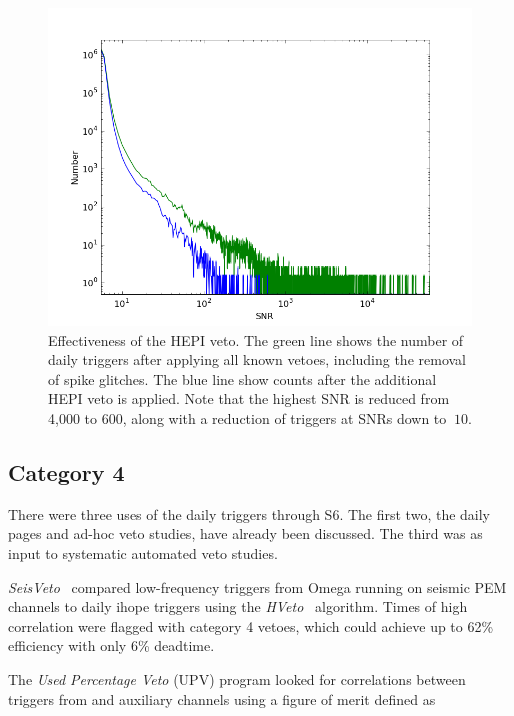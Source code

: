 \begin{figure}
  \includegraphics[width=\linewidth]{figures/detchar/L1-S6B2-snrhist_Cat1234_Spike_HEPI}
  \caption[Effectiveness of the HEPI veto] {
Effectiveness of the HEPI veto. The green line shows the number of
daily triggers after applying all known vetoes, including the removal
of spike glitches.  The blue line show counts after the additional
HEPI veto is applied.  Note that the highest SNR is reduced from 
4,000 to 600, along with a reduction of triggers at SNRs down to 
$~ 10$.}
\end{figure}


\subsection{Category 4}



There were three uses of the daily triggers through S6.  The first
two, the daily pages and ad-hoc veto studies, have already been
discussed.  The third was as input to systematic automated veto
studies.

\emph{SeisVeto}~\cite{} compared low-frequency triggers from Omega
running on seismic PEM channels to daily ihope triggers using the
\emph{HVeto}~\cite{} algorithm.  Times of high correlation were
flagged with category 4 vetoes, which could achieve up to 62\%
efficiency with only 6\% deadtime.

The \emph{Used Percentage Veto} (UPV) program looked for correlations
between triggers from \darmerr and auxiliary channels using a figure
of merit defined as

